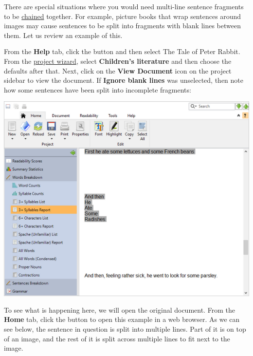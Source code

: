 \documentclass[
]{book}
\theoremstyle{definition}
\theoremstyle{definition}
\theoremstyle{definition}
\theoremstyle{definition}
\theoremstyle{remark}
\begin{document}
There are special situations where you would need multi-line sentence fragments to be \protect\hyperlink{line-chaining}{chained} together. For example, picture books that wrap sentences around images may cause sentences to be split into fragments with blank lines between them. Let us review an example of this.

From the \textbf{Help} tab, click the  button and then select The Tale of Peter Rabbit. From the \protect\hyperlink{creating-standard-project}{project wizard}, select \textbf{Children's literature} and then choose the defaults after that. Next, click on the \textbf{View Document} icon on the project sidebar to view the document. If \textbf{Ignore blank lines} was unselected, then note how some sentences have been split into incomplete fragments:

\includegraphics{Images/PeterRabbitSplitSentences.png}

To see what is happening here, we will open the original document. From the \textbf{Home} tab, click the  button to open this example in a web browser. As we can see below, the sentence in question is split into multiple lines. Part of it is on top of an image, and the rest of it is split across multiple lines to fit next to the image.
\end{document}
